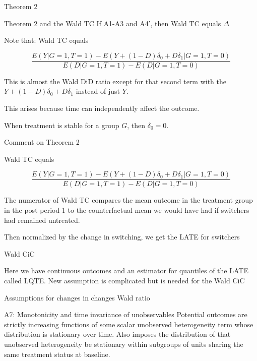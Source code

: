 \documentclass{beamer}
\begin{document}
\begin{frame}{Theorem 2}

\begin{block}{Theorem 2 and the Wald TC}
If A1-A3 and A4', then Wald TC equals $\Delta$
\end{block}

Note that: Wald TC equals

$$
\frac{
E  (Y | G=1,T=1) - 
E(Y+ (1-D)\delta_0 + D \delta_1 | G=1, T=0 )}{
E(D|G=1,T=1) - E(D|G=1,T=0)}$$

This is almost the Wald DiD ratio except for that second term with the $Y+(1-D)\delta_0 + D\delta_1$ instead of just $Y$. \\

\bigskip 

This arises because time can independently affect the outcome.  \\

\bigskip

When treatment is stable for a group $G$, then $\delta_0=0$. \\


\end{frame}


\begin{frame}{Comment on Theorem 2}

Wald TC equals

$$
\frac{
E  (Y | G=1,T=1) - 
E(Y+ (1-D)\delta_0 + D \delta_1 | G=1, T=0 )}{
E(D|G=1,T=1) - E(D|G=1,T=0)}$$

The numerator of Wald TC compares the mean outcome in the treatment group in the post period 1 to the counterfactual mean we would have had if switchers had remained untreated.  \\

\bigskip 

Then normalized by the change in switching, we get the LATE for switchers

\end{frame}

\begin{frame}{Wald CiC}

Here we have continuous outcomes and an estimator for quantiles of the LATE called LQTE.  New assumption is complicated but is needed for the Wald CiC

\end{frame}

\begin{frame}{Assumptions for changes in changes Wald ratio}


\begin{block}{A7: Monotonicity and time invariance of unobservables}
Potential outcomes are strictly increasing functions of some scalar unobserved heterogeneity term whose distribution is stationary over time.  Also imposes the distribution of that unobserved heterogeneity be stationary within subgroups of units sharing the same treatment status at baseline.
\end{block}

\end{frame}
\end{document}
